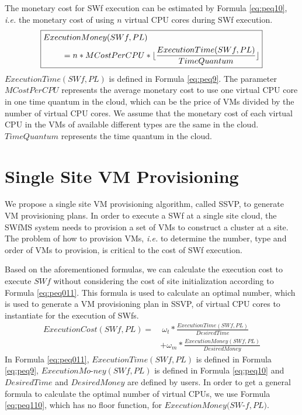 The monetary cost for SWf execution can be estimated by Formula \ref{eq:peq10}, \textit{i.e.} the monetary cost of using $n$ virtual CPU cores during SWf execution.
\begin{equation}\label{eq:peq10}
\boxed{
\begin{split}
Exec&utionMoney( SWf, PL ) \\&= n * MCostPerCPU * \lfloor\frac{ExecutionTime( SWf, PL )}{TimeQuantum}\rfloor
\end{split}
}
\end{equation}
$ExecutionTime( SWf, PL )$ is defined in Formula \ref{eq:peq9}. The parameter $MCostPerCPU$ represents the average monetary cost to use one virtual CPU core in one time quantum in the cloud, which can be the price of VMs divided by the number of virtual CPU cores. We assume that the monetary cost of each virtual CPU in the VMs of available different types are the same in the cloud. $TimeQuantum$ represents the time quantum in the cloud. 

\section{Single Site VM Provisioning}
\label{sec:PVMD}
We propose a single site VM provisioning algorithm, called SSVP, to generate VM provisioning plans.
In order to execute a SWf at a single site cloud, the SWfMS system needs to provision a set of VMs to construct a cluster at a site. The problem of how to provision VMs, \textit{i.e.} to determine the number, type and order of VMs to provision, is critical to the cost of SWf execution. 

Based on the aforementioned formulas, we can calculate the execution cost to execute $SWf$ without considering the cost of site initialization according to Formula \ref{eq:peq011}. This formula is used to calculate an optimal number, which is used to generate a VM provisioning plan in SSVP, of virtual CPU cores to instantiate for the execution of SWfs.
\begin{equation}\label{eq:peq011}
\begin{split}
ExecutionCost( SWf, PL ) = &~\omega_t * \frac{ExecutionTime( SWf, PL )}{DesiredTime} \\&+ \omega_m * \frac{ExecutionMoney( SWf, PL )}{DesiredMoney}
\end{split}
\end{equation}
In Formula \ref{eq:peq011}, $ExecutionTime( SWf, PL )$ is defined in Formula \ref{eq:peq9}, $ExecutionMo$-$ney( SWf, PL )$ is defined in Formula \ref{eq:peq10} and $DesiredTime$ and $DesiredMoney$ are defined by users. In order to get a general formula to calculate the optimal number of virtual CPUs, we use Formula \ref{eq:peq110}, which has no floor function, for $ExecutionMoney( SW$-$f, PL )$. 

